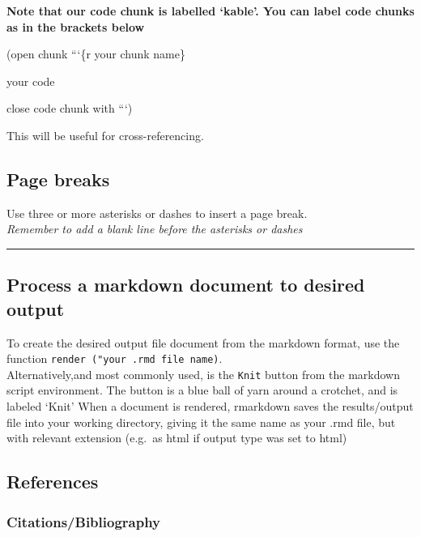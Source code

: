\documentclass[
]{book}
\begin{document}
\textbf{Note that our code chunk is labelled `kable'. You can label code chunks as in the brackets below}

(open chunk ```\{r your chunk name\}

your code

close code chunk with ```)

This will be useful for cross-referencing.

\hypertarget{page-breaks}{%
\subsection{Page breaks}\label{page-breaks}}

Use three or more asterisks or dashes to insert a page break.\\
\emph{Remember to add a blank line before the asterisks or dashes}

\begin{center}\rule{0.5\linewidth}{0.5pt}\end{center}

\hypertarget{process-a-markdown-document-to-desired-output}{%
\subsection{Process a markdown document to desired output}\label{process-a-markdown-document-to-desired-output}}

To create the desired output file document from the markdown format, use the function \texttt{render\ ("your\ .rmd\ file\ name)}.\\
Alternatively,and most commonly used, is the \texttt{Knit} button from the markdown script environment. The button is a blue ball of yarn around a crotchet, and is labeled `Knit'
When a document is rendered, rmarkdown saves the results/output file into your working directory, giving it the same name as your .rmd file, but with relevant extension (e.g.~as html if output type was set to html)

\hypertarget{references}{%
\subsection{References}\label{references}}

\hypertarget{citationsbibliography}{%
\subsubsection{Citations/Bibliography}\label{citationsbibliography}}
\end{document}
